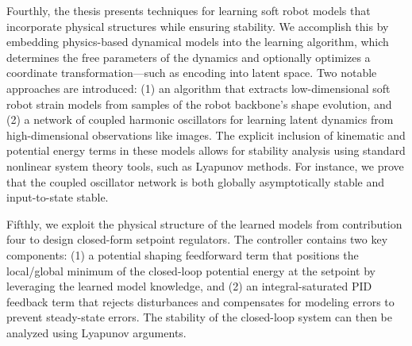 Fourthly, the thesis presents techniques for learning soft robot models that incorporate physical structures while ensuring stability. We accomplish this by embedding physics-based dynamical models into the learning algorithm, which determines the free parameters of the dynamics and optionally optimizes a coordinate transformation—such as encoding into latent space. Two notable approaches are introduced: (1) an algorithm that extracts low-dimensional soft robot strain models from samples of the robot backbone’s shape evolution, and (2) a network of coupled harmonic oscillators for learning latent dynamics from high-dimensional observations like images. The explicit inclusion of kinematic and potential energy terms in these models allows for stability analysis using standard nonlinear system theory tools, such as Lyapunov methods. For instance, we prove that the coupled oscillator network is both globally asymptotically stable and input-to-state stable.

Fifthly, we exploit the physical structure of the learned models from contribution four to design closed-form setpoint regulators. The controller contains two key components: (1) a potential shaping feedforward term that positions the local/global minimum of the closed-loop potential energy at the setpoint by leveraging the learned model knowledge, and (2) an integral-saturated PID feedback term that rejects disturbances and compensates for modeling errors to prevent steady-state errors. The stability of the closed-loop system can then be analyzed using Lyapunov arguments.


